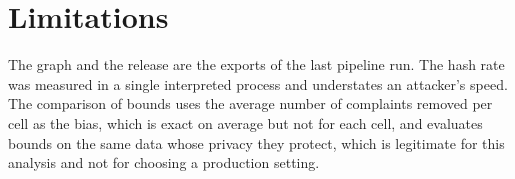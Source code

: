 \section{Limitations}\label{sec:gp-limits}

The graph and the release are the exports of the last pipeline run. The hash rate was measured in a single interpreted
process and understates an attacker's speed. The comparison of bounds uses the average number of complaints removed per
cell as the bias, which is exact on average but not for each cell, and evaluates bounds on the same data whose privacy they
protect, which is legitimate for this analysis and not for choosing a production setting.
